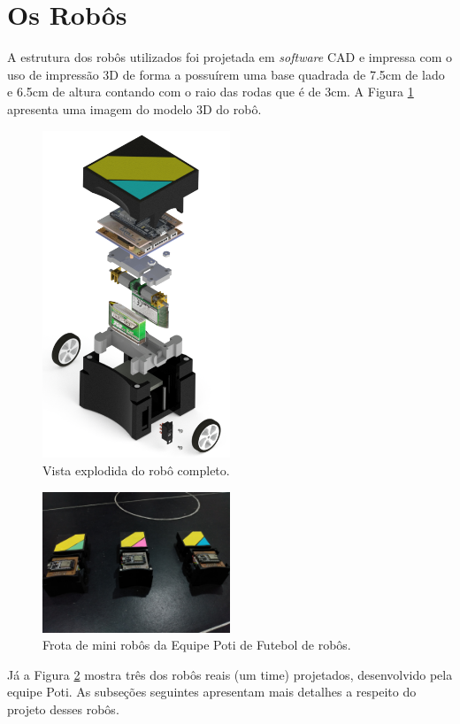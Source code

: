 \section{Os Robôs}
A estrutura dos robôs utilizados foi projetada em \emph{software} CAD e impressa com o uso de impressão 3D de forma a possuírem uma base quadrada de 7.5cm de lado e 6.5cm de altura contando com o raio das rodas que é de 3cm. A Figura \ref{fig:robo_completo_explodido} apresenta uma imagem do modelo 3D do robô.\\

\begin{figure}[H]
    \centering
    \includegraphics[width=0.5\textwidth]{figuras/robo/robo_completo_explodido.png}
    \caption{Vista explodida do robô completo.}
    \label{fig:robo_completo_explodido}
\end{figure}

\begin{figure}[H]
    \centering
    \includegraphics[width=0.5\textwidth]{figuras/robo/robos_capa_aberta.jpg}
    \caption{Frota de mini robôs da Equipe Poti de Futebol de robôs.}
    \label{fig:robos_capa_aberta}
\end{figure}

Já a Figura \ref{fig:robos_capa_aberta} mostra três dos robôs reais (um time) projetados, desenvolvido pela equipe Poti. As subseções seguintes apresentam mais detalhes a respeito do projeto desses robôs.


